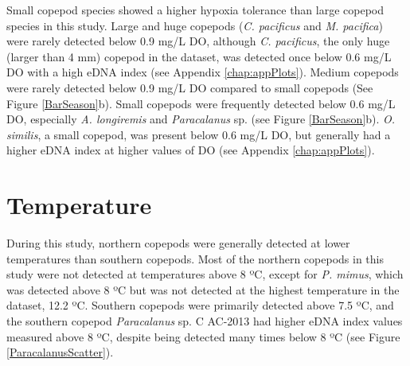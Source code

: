 \documentclass[12pt,twoside]{reedthesis}
\begin{document}
	Small copepod species showed a higher hypoxia tolerance than large copepod species in this study. Large and huge copepods (\textit{C. pacificus} and \textit{M. pacifica}) were rarely detected below 0.9 mg/L DO, although \textit{C. pacificus}, the only huge (larger than 4 mm) copepod in the dataset, was detected once below 0.6 mg/L DO with a high eDNA index (see Appendix \ref{chap:appPlots}). Medium copepods were rarely detected below 0.9 mg/L DO compared to small copepods (See Figure \ref{BarSeason}b). Small copepods were frequently detected below 0.6 mg/L DO, especially \textit{A. longiremis} and \textit{Paracalanus} sp. (see Figure \ref{BarSeason}b). \textit{O. similis}, a small copepod, was present below 0.6 mg/L DO, but generally had a higher eDNA index at higher values of DO (see Appendix \ref{chap:appPlots}).
	
	
	\section{Temperature}
	
	During this study, northern copepods were generally detected at lower temperatures than southern copepods. Most of the northern copepods in this study were not detected at temperatures above 8 ºC, except for \textit{P. mimus}, which was detected above 8 ºC but was not detected at the highest temperature in the dataset, 12.2 ºC. Southern copepods were primarily detected above 7.5 ºC, and the southern copepod \textit{Paracalanus} sp. C AC-2013 had higher eDNA index values measured above 8 ºC, despite being detected many times below 8 ºC (see Figure \ref{ParacalanusScatter}). 
	
\end{document}

